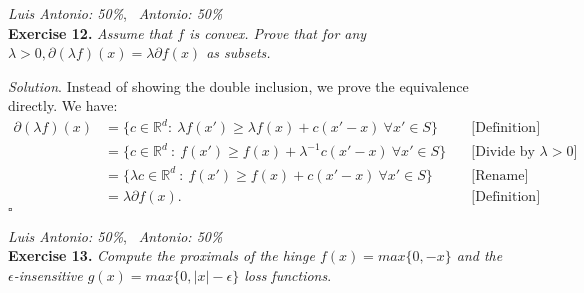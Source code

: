 \documentclass[12pt]{article}
\newcommand*{\QED}{\null\nobreak\hfill\ensuremath{\square}}%
\begin{document}
\textit{Luis Antonio: 50\%}, \ \textit{Antonio: 50\%}\\
\textbf{Exercise 12. }\emph{Assume that \( f \)  is convex. Prove that for any \( \lambda > 0, \partial(\lambda f)(x) = \lambda \partial f(x) \) as subsets.}

\emph{Solution}. Instead of showing the double inclusion, we prove the equivalence directly. We have:
\[
    \begin{align*}
     \partial(\lambda f)(x) &= \{c \in \mathbb{R}^d: \ \lambda f(x') \geq \lambda f(x) + c(x' - x)\ \forall x' \in S\} \quad &\text{[Definition]}\\
     &= \{c \in \mathbb{R}^d \ : \  f(x') \geq f(x) + \lambda^{-1} c(x' - x)\ \forall x' \in S\}\quad &\text{[Divide by $\lambda>0$]} \\
     &= \{\lambda c \in \mathbb{R}^d \ : \  f(x') \geq f(x) + c(x' - x)\ \forall x' \in S\}\quad &\text{[Rename]} \\
     &= \lambda \partial f(x).\quad &\text{[Definition]}
   \end{align*}
\]
\QED

\vspace{.5em}

\textit{Luis Antonio: 50\%}, \ \textit{Antonio: 50\%}\\
\textbf{Exercise 13. }\emph{Compute the proximals of the hinge \( f(x) = max\{0, -x\}  \) and the \( \epsilon \)-insensitive \( g(x)=max\{0, |x| - \epsilon\} \) loss functions}.
\end{document}
